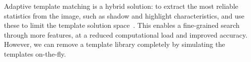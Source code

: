 














Adaptive template matching is a hybrid solution: to extract the most reliable statistics from the image, such as shadow and highlight characteristics, and use these to limit the template solution space~\cite{Midelfart2010}. This enables a fine-grained search through more features, at a reduced computational load and improved accuracy. However, we can remove a template library completely by simulating the templates on-the-fly.

